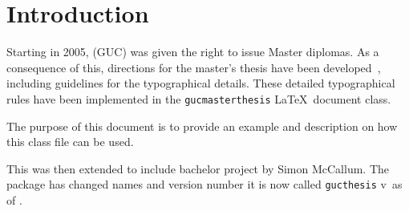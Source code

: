 \chapter{Introduction}
\label{chap:introduction}

Starting in 2005, \GUC (GUC) was given the
right to issue Master diplomas. As a consequence of this, directions
for the master's thesis have been developed~\cite{GUCMaster},
including guidelines for the typographical details. These detailed
typographical rules have been implemented in the
\texttt{gucmasterthesis} \LaTeX\ document class.

The purpose of this document is to provide an example and description
on how this class file can be used.

This was then extended to include bachelor project by Simon McCallum.
The package has changed names and version number it is now called
\texttt{gucthesis}
v\gucthesisversion\ as of \gucthesisdate.
